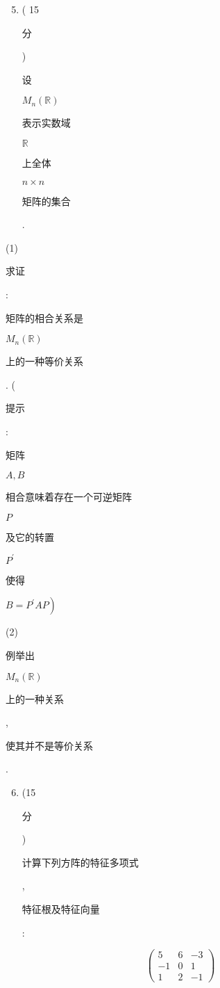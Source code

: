 \documentclass[10pt]{article}
\begin{document}
\begin{enumerate}
  \setcounter{enumi}{4}
  \item ( 15 \begin{CJK}{UTF8}{mj}分\end{CJK}) \begin{CJK}{UTF8}{mj}设\end{CJK} $M_{n}(\mathbb{R})$ \begin{CJK}{UTF8}{mj}表示实数域\end{CJK} $\mathbb{R}$ \begin{CJK}{UTF8}{mj}上全体\end{CJK} $n \times n$ \begin{CJK}{UTF8}{mj}矩阵的集合\end{CJK}.
\end{enumerate}
(1) \begin{CJK}{UTF8}{mj}求证\end{CJK}: \begin{CJK}{UTF8}{mj}矩阵的相合关系是\end{CJK} $M_{n}(\mathbb{R})$ \begin{CJK}{UTF8}{mj}上的一种等价关系\end{CJK}. (\begin{CJK}{UTF8}{mj}提示\end{CJK}: \begin{CJK}{UTF8}{mj}矩阵\end{CJK} $A, B$ \begin{CJK}{UTF8}{mj}相合意味着存在一个可逆矩阵\end{CJK} $P$ \begin{CJK}{UTF8}{mj}及它的转置\end{CJK} $P^{\prime}$ \begin{CJK}{UTF8}{mj}使得\end{CJK} $\left.B=P^{\prime} A P\right)$

(2) \begin{CJK}{UTF8}{mj}例举出\end{CJK} $M_{n}(\mathbb{R})$ \begin{CJK}{UTF8}{mj}上的一种关系\end{CJK}, \begin{CJK}{UTF8}{mj}使其并不是等价关系\end{CJK}.

\begin{enumerate}
  \setcounter{enumi}{5}
  \item (15 \begin{CJK}{UTF8}{mj}分\end{CJK}) \begin{CJK}{UTF8}{mj}计算下列方阵的特征多项式\end{CJK}, \begin{CJK}{UTF8}{mj}特征根及特征向量\end{CJK}:
\end{enumerate}
$$
\left(\begin{array}{ccc}
5 & 6 & -3 \\
-1 & 0 & 1 \\
1 & 2 & -1
\end{array}\right)
$$
\end{document}
